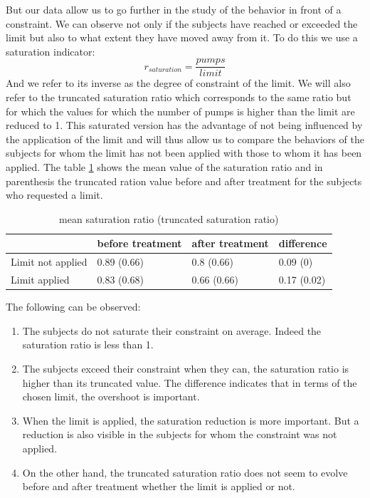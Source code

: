 \documentclass[
]{book}
\providecommand{\tightlist}{%
  \setlength{\itemsep}{0pt}\setlength{\parskip}{0pt}}
\begin{document}
But our data allow us to go further in the study of the behavior in front of a
constraint.
We can observe not only if the subjects have reached or exceeded the limit but
also to what extent they have moved away from it.
To do this we use a saturation indicator:
\[
r_{saturation} = \frac{pumps}{limit}
\]
And we refer to its inverse as the degree of constraint of the limit.
We will also refer to the truncated saturation ratio which corresponds to the
same ratio but for which the values for which the number of pumps is higher than
the limit are reduced to 1.
This saturated version has the advantage of not being influenced by the
application of the limit and will thus allow us to compare the behaviors of the
subjects for whom the limit has not been applied with those to whom it has been
applied.
The table \ref{tab:sat-ratio2} shows the mean value of the saturation ratio and
in parenthesis the truncated ration value before and after treatment for the
subjects who requested a limit.

\begin{table}

\caption{\label{tab:sat-ratio2}mean saturation ratio (truncated saturation ratio)}
\centering
\begin{tabular}[t]{l|l|l|l}
\hline
 & before treatment & after treatment & difference\\
\hline
Limit not applied & 0.89 (0.66) & 0.8 (0.66) & 0.09 (0)\\
\hline
Limit applied & 0.83 (0.68) & 0.66 (0.66) & 0.17 (0.02)\\
\hline
\end{tabular}
\end{table}

The following can be observed:

\begin{enumerate}
\def\labelenumi{\arabic{enumi}.}
\tightlist
\item
  The subjects do not saturate their constraint on average.
  Indeed the saturation ratio is less than 1.
\item
  The subjects exceed their constraint when they can, the saturation ratio is
  higher than its truncated value.
  The difference indicates that in terms of the chosen limit, the overshoot is
  important.
\item
  When the limit is applied, the saturation reduction is
  more important.
  But a reduction is also visible in the subjects for whom the constraint was
  not applied.
\item
  On the other hand, the truncated saturation ratio does not seem to evolve
  before and after treatment whether the limit is applied or not.
\end{enumerate}
\end{document}

